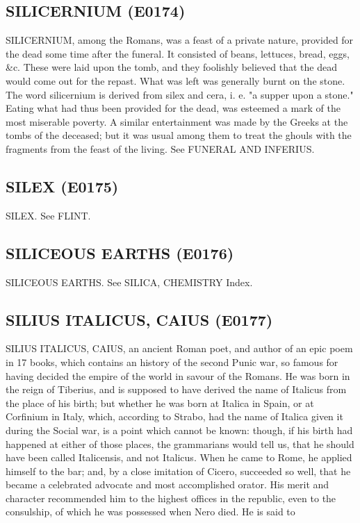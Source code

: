 \documentclass{article}
\begin{document}
\subsection*{SILICERNIUM (E0174)}
SILICERNIUM, among the Romans, was a feast of a private nature, provided for the dead some time after the funeral. It consisted of beans, lettuces, bread, eggs, \&c. These were laid upon the tomb, and they foolishly believed that the dead would come out for the repast. What was left was generally burnt on the stone. The word silicernium is derived from silex and cera, i. e. "a supper upon a stone." Eating what had thus been provided for the dead, was esteemed a mark of the most miserable poverty. A similar entertainment was made by the Greeks at the tombs of the deceased; but it was usual among them to treat the ghouls with the fragments from the feast of the living. See FUNERAL AND INFERIUS.

\subsection*{SILEX (E0175)}
SILEX. See FLINT.

\subsection*{SILICEOUS EARTHS (E0176)}
SILICEOUS EARTHS. See SILICA, CHEMISTRY Index.

\subsection*{SILIUS ITALICUS, CAIUS (E0177)}
SILIUS ITALICUS, CAIUS, an ancient Roman poet, and author of an epic poem in 17 books, which contains an history of the second Punic war, so famous for having decided the empire of the world in savour of the Romans. He was born in the reign of Tiberius, and is supposed to have derived the name of Italicus from the place of his birth; but whether he was born at Italica in Spain, or at Corfinium in Italy, which, according to Strabo, had the name of Italica given it during the Social war, is a point which cannot be known: though, if his birth had happened at either of those places, the grammarians would tell us, that he should have been called Italicensis, and not Italicus. When he came to Rome, he applied himself to the bar; and, by a close imitation of Cicero, succeeded so well, that he became a celebrated advocate and most accomplished orator. His merit and character recommended him to the highest offices in the republic, even to the consulship, of which he was possessed when Nero died. He is said to
\end{document}
